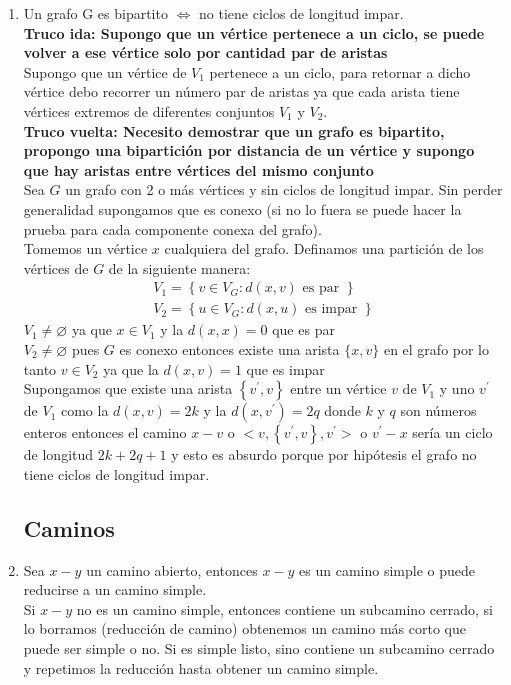 \documentclass{article}
\begin{document}
\begin{enumerate}
    \item Un grafo G es bipartito $\iff$ no tiene ciclos de longitud impar. \\
    \textbf{Truco ida: Supongo que un vértice pertenece a un ciclo, se puede volver a ese vértice solo por cantidad par de aristas} \\
    Supongo que un vértice de $V_1$ pertenece a un ciclo, para retornar a dicho vértice debo recorrer un número par de aristas ya que cada arista tiene vértices extremos de diferentes conjuntos $V_1$ y $V_2$. \\
    \textbf{Truco vuelta: Necesito demostrar que un grafo es bipartito, propongo una bipartición por distancia de un vértice y supongo que hay aristas entre vértices del mismo conjunto} \\
    Sea $G$ un grafo con 2 o más vértices y sin ciclos de longitud impar. Sin perder generalidad supongamos que es conexo (si no lo fuera se puede hacer la prueba para cada componente conexa del grafo). \\
    Tomemos un vértice $x$ cualquiera del grafo. Definamos una partición de los vértices de $G$ de la siguiente manera:
    $$
    \begin{array}{c}
    V_{1}=\left\{v \in V_{G}: d(x, v) \text { es par }\right\} \\
    V_{2}=\left\{u \in V_{G}: d(x, u) \text { es impar }\right\}
    \end{array}
    $$
    $V_{1} \neq\varnothing $ ya que $x \in V_{1}$ y la $d(x, x)=0$ que es par \\
    $V_{2} \neq\varnothing $ pues $G$ es conexo entonces existe una arista $\{x, v\}$ en el grafo por lo tanto $v \in V_{2}$ ya que la $d(x, v)=1$ que es impar \\
    Supongamos que existe una arista $\left\{v^{\prime}, v\right\}$ entre un vértice $v$ de $V_{1}$ y uno $v^{\prime}$ de $V_{1}$ como la $d(x, v)=2 k$ y la $d\left(x, v^{\prime}\right)=2 q$ donde $k$ y $q$ son números enteros entonces el camino $x-v$ o $<v,\left\{v^{\prime}, v\right\}, v^{\prime}>$ o $v^{\prime}-x$ sería un ciclo de longitud $2 k+2 q+1$ y esto es absurdo porque por hipótesis el grafo no tiene ciclos de longitud impar.

\subsection{Caminos}

    \item Sea $x - y$ un camino abierto, entonces $x − y$ es un camino simple o puede reducirse a un camino simple. \\
    Si $x - y$ no es un camino simple, entonces contiene un subcamino cerrado, si lo
    borramos (reducción de camino) obtenemos un camino más corto que puede ser
    simple o no. Si es simple listo, sino contiene un subcamino cerrado y repetimos la reducción hasta obtener un camino simple.
    

\end{enumerate}
\end{document}
